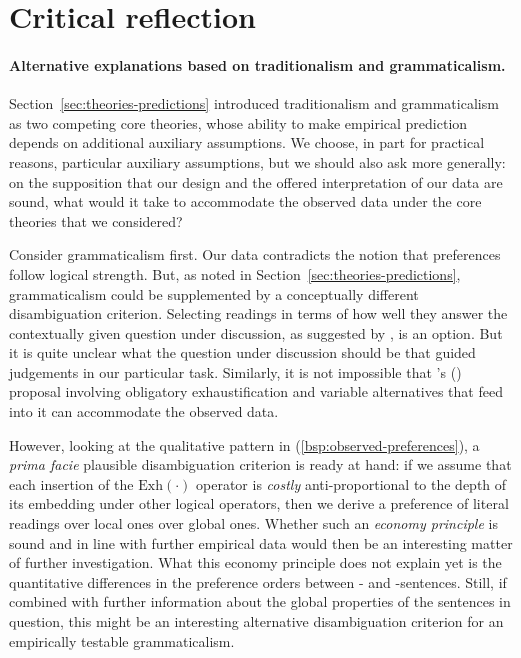 \documentclass[fleqn,reqno,10pt]{article}
\newcommand{\as}{\acro{as}}
\renewcommand{\es}{\acro{es}}
\newcommand{\exh}{\ensuremath{\mathrm{Exh}}}
\begin{document}
\section{Critical reflection}
\label{sec:critical-reflection}

\paragraph{Alternative explanations based on traditionalism and
  grammaticalism.} Section~\ref{sec:theories-predictions} introduced
traditionalism and grammaticalism as two competing core theories,
whose ability to make empirical prediction depends on additional
auxiliary assumptions. We choose, in part for practical reasons,
particular auxiliary assumptions, but we should also ask more
generally: on the supposition that our design and the offered
interpretation of our data are sound, what would it take to
accommodate the observed data under the core theories that we
considered?

Consider grammaticalism first. Our data contradicts the notion that
preferences follow logical strength. But, as noted in
Section~\ref{sec:theories-predictions}, grammaticalism could be
supplemented by a conceptually different disambiguation
criterion. Selecting readings in terms of how well they answer the
contextually given question under discussion, as suggested by
\citet{Fox2007:Free-Choice-and,GualminiHulsey2008:The-Question-An}, is
an option. But it is quite unclear what the question under discussion
should be that guided judgements in our particular task. Similarly, it
is not impossible that \citeauthor{Magri2011:Another-Argumen}'s
(\citeyear{Magri2011:Another-Argumen}) proposal involving obligatory
exhaustification and variable alternatives that feed into it can
accommodate the observed data.  

However, looking at the qualitative pattern in
(\ref{bsp:observed-preferences}), a \emph{prima facie} plausible
disambiguation criterion is ready at hand: if we assume that each
insertion of the $\exh(\cdot)$ operator is \emph{costly}
anti-proportional to the depth of its embedding under other logical
operators, then we derive a preference of literal readings over local
ones over global ones. Whether such an \emph{economy principle} is
sound and in line with further empirical data would then be an
interesting matter of further investigation. What this economy
principle does not explain yet is the quantitative differences in the
preference orders between \as- and \es-sentences. Still, if combined
with further information about the global properties of the sentences
in question, this might be an interesting alternative disambiguation
criterion for an empirically testable grammaticalism.
\end{document}

